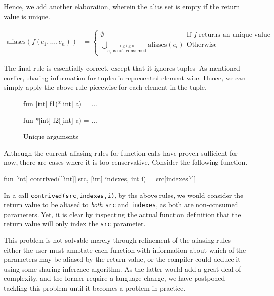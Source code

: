 \documentclass[oneside]{memoir}
\newcommand\aliases[1]{\textrm{aliases}(#1)}
\begin{document}
Hence, we add another elaboration, wherein the alias set is empty if
the return value is unique.

\begin{align*}
  \aliases{f(e_{1}, \ldots, e_{n})} &=
  \begin{cases}
    \emptyset & \mbox{If $f$ returns an unique value}\\
    \bigcup_{\overset{1 \leq i \leq n}{\text{$e_{i}$ is not consumed}}} \aliases{e_{i}} & \mbox{Otherwise}
  \end{cases}
\end{align*}

The final rule is essentially correct, except that it ignores tuples.
As mentioned earlier, sharing information for tuples is represented
element-wise.  Hence, we can simply apply the above rule piecewise for
each element in the tuple.

\begin{figure}
\begin{center}
\begin{colorcode}
fun [int] f1(*[int] a) = ...

fun *[int] f2([int] a) = ...
\end{colorcode}
\end{center}
\caption{Unique arguments}
\label{fig:unique-arguments}
\end{figure}

Although the current aliasing rules for function calls have proven
sufficient for now, there are cases where it is too conservative.
Consider the following function.

\begin{colorcode}
fun [int] contrived([[int]] src, [int] indexes, int i) =
  src[indexes[i]]
\end{colorcode}

In a call \texttt{contrived(src,indexes,i)}, by the above rules, we
would consider the return value to be aliased to \textit{both}
\texttt{src} and \texttt{indexes}, as both are non-consumed
parameters.  Yet, it is clear by inspecting the actual function
definition that the return value will only index the \texttt{src}
parameter.

This problem is not solvable merely through refinement of the aliasing
rules - either the user must annotate each function with information
about which of the parameters may be aliased by the return value, or
the compiler could deduce it using some sharing inference algorithm.
As the latter would add a great deal of complexity, and the former
require a language change, we have postponed tackling this problem
until it becomes a problem in practice.
\end{document}
